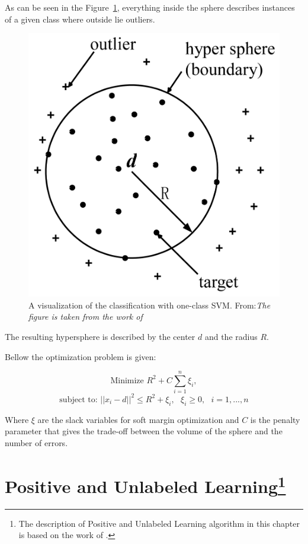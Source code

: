 As can be seen in the Figure~\ref{fig:hypersphere}, everything inside the sphere describes instances of a given class where outside lie outliers.
\begin{figure}[h!]
    \centering
    \includegraphics[scale=0.2]{Graphics/tax-duin-svm.png}
    \caption{
    A visualization of the classification with one-class SVM. 
    From:\textit{The figure is taken from the work of}~\cite{s120810109}
    }
    \label{fig:hypersphere}
\end{figure}
The resulting hypersphere is described by the center \(d\) and the radius
\(R\).

Bellow the optimization problem is given: 

\[ \textrm{Minimize } R^2 + C \sum_{i=1}^{n} \xi_i, \]
\[ \textrm{subject to: } || x_i - d ||^2 \leq R^2 + \xi_i, \textrm{ } \xi_i \geq 0, \textrm{ } i = 1, ..., n \]

Where \( \xi \) are the slack variables for soft margin optimization and \( C \)  is the penalty parameter that gives the trade-off between the volume of the sphere and the number of errors.

\section[Positive and Unlabeled Learning]{Positive and Unlabeled Learning\footnote{The description of Positive and Unlabeled Learning algorithm in this chapter is based on the work of \cite{Elkan;Noto:2008}.}}\label{Chapter:PUL}


